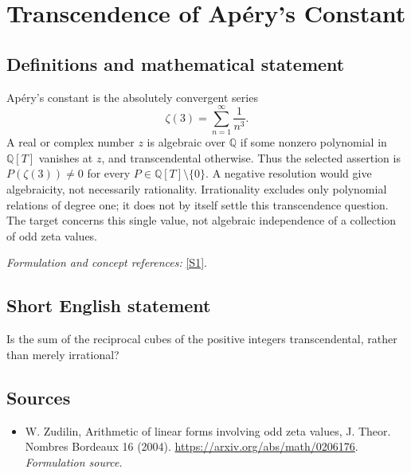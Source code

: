\documentclass[11pt]{article}
\begin{document}
\section*{\texorpdfstring{Transcendence of Apéry's Constant}{Transcendence of Apéry's Constant}}\label{statement}
\subsection{Definitions and mathematical statement}
Ap\'ery's constant is the absolutely convergent series
\[
 \zeta(3)=\sum_{n=1}^{\infty}\frac1{n^3}.
\]
A real or complex number $z$ is algebraic over ${\mathbb{Q}}$ if some nonzero polynomial in ${\mathbb{Q}}[T]$ vanishes at $z$, and transcendental otherwise. Thus the selected assertion is
$P(\zeta(3))\ne0$ for every $P\in{\mathbb{Q}}[T]\setminus\{0\}$.
A negative resolution would give algebraicity, not necessarily rationality. Irrationality excludes only polynomial relations of degree one; it does not by itself settle this transcendence question. The target concerns this single value, not algebraic independence of a collection of odd zeta values.
\par\smallskip\textit{Formulation and concept references:} \href{https://arxiv.org/abs/math/0206176}{[S1]}.

\subsection{Short English statement}
Is the sum of the reciprocal cubes of the positive integers transcendental, rather than merely irrational?
\subsection{Sources}
\begin{itemize}
\item[S1]W. Zudilin, Arithmetic of linear forms involving odd zeta values, J. Theor. Nombres Bordeaux 16 (2004).
\url{https://arxiv.org/abs/math/0206176}.
\textit{Formulation source.}
\end{itemize}
\end{document}

